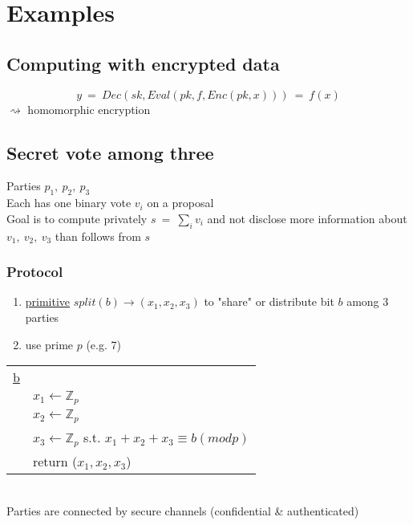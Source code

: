 \documentclass{report}
\begin{document}
 \section{Examples}
 \begin{adjustwidth}{2em}{2em}
 	\subsection{Computing with encrypted data}
 	\begin{adjustwidth}{2em}{2em}
 		\begin{center}\begin{tikzpicture}
 		\end{tikzpicture}\end{center}
 		\[
 			y \ = \ Dec(sk, Eval(pk, f, Enc(pk, x))) \ = \ f(x)
 		\]
 		$\rightsquigarrow$ homomorphic encryption
 	\end{adjustwidth}
 	\subsection{Secret vote among three}
 	\begin{adjustwidth}{2em}{2em}
 		Parties $p_1, \ p_2, \ p_3$ \\
 		Each has one binary vote $v_i$ on a proposal \\
 		Goal is to compute privately $s \ = \ \sum_i v_i$ and not disclose more information about $v_1, \ v_2, \ v_3$ than follows from $s$
 		\subsubsection{Protocol}
 		\begin{adjustwidth}{2em}{}
 			\begin{enumerate}[-]
 				\item \underline{primitive} $split(b) \rightarrow (x_1, x_2, x_3)$ to "share" or distribute bit $b$ among 3 parties
 				\item use prime $p$ (e.g. 7)
 			\end{enumerate}
 			\begin{tabular}{ll}
 				\underline{b} \\
 				& $x_1 \leftarrow \mathbb{Z}_p$ \\
 				& $x_2 \leftarrow \mathbb{Z}_p$ \\
 				& $x_3 \leftarrow \mathbb{Z}_p$ s.t. $x_1 + x_2 + x_3 \equiv b (mod p)$\\
 				& return ($x_1 , x_2, x_3$)
 			\end{tabular} \\
 			Parties are connected by secure channels (confidential \& authenticated)
 		\end{adjustwidth}

\end{adjustwidth}
\end{adjustwidth}
\end{document}

